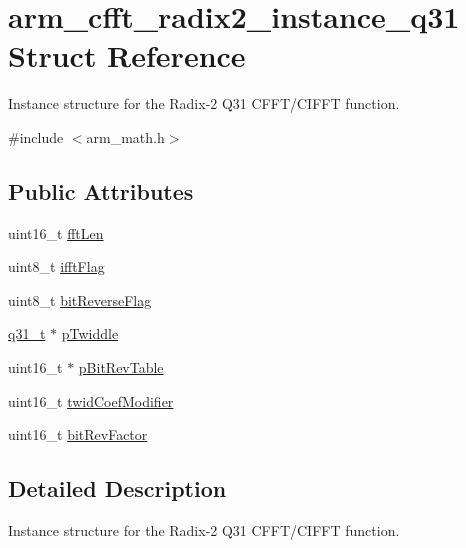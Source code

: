 \hypertarget{structarm__cfft__radix2__instance__q31}{}\section{arm\+\_\+cfft\+\_\+radix2\+\_\+instance\+\_\+q31 Struct Reference}
\label{structarm__cfft__radix2__instance__q31}


Instance structure for the Radix-\/2 Q31 C\+F\+F\+T/\+C\+I\+F\+FT function.  




{\ttfamily \#include $<$arm\+\_\+math.\+h$>$}

\subsection*{Public Attributes}
\begin{DoxyCompactItemize}
\item 
uint16\+\_\+t \hyperlink{structarm__cfft__radix2__instance__q31_a960199f1373a192366878ef279eab00f}{fft\+Len}
\item 
uint8\+\_\+t \hyperlink{structarm__cfft__radix2__instance__q31_a2607378ce64be16698bb8a3b1af8d3c8}{ifft\+Flag}
\item 
uint8\+\_\+t \hyperlink{structarm__cfft__radix2__instance__q31_a6239b8d268285334e88c008c07d68616}{bit\+Reverse\+Flag}
\item 
\hyperlink{arm__math_8h_adc89a3547f5324b7b3b95adec3806bc0}{q31\+\_\+t} $\ast$ \hyperlink{structarm__cfft__radix2__instance__q31_a1d5bbe9a991e133f81652a77a7985d23}{p\+Twiddle}
\item 
uint16\+\_\+t $\ast$ \hyperlink{structarm__cfft__radix2__instance__q31_ada8e5264f4b22ff4c621817978994674}{p\+Bit\+Rev\+Table}
\item 
uint16\+\_\+t \hyperlink{structarm__cfft__radix2__instance__q31_ae63ca9193322cd477970c1d2086407d1}{twid\+Coef\+Modifier}
\item 
uint16\+\_\+t \hyperlink{structarm__cfft__radix2__instance__q31_a9d17a87263953fe3559a007512c9f3a4}{bit\+Rev\+Factor}
\end{DoxyCompactItemize}


\subsection{Detailed Description}
Instance structure for the Radix-\/2 Q31 C\+F\+F\+T/\+C\+I\+F\+FT function. 

